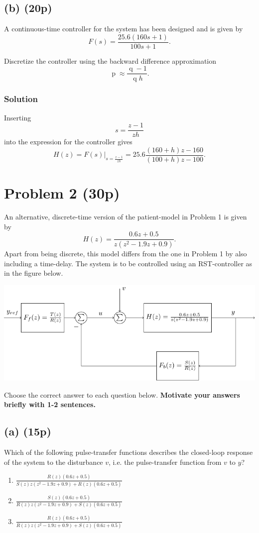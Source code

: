 \documentclass{scrartcl}
\begin{document}
\subsection*{(b) (20p)}
\label{sec-1-2}
A continuous-time controller for the system has been designed and is given by 
\[ F(s) = \frac{25.6(160s+1)}{100s+1}. \]

Discretize the controller using the backward difference approximation
\[ \operatorname{p} \approx \frac{\operatorname{q}-1}{\operatorname{q}h}. \]

\subsubsection*{Solution}
\label{sec-1-2-1}
Inserting \[s = \frac{z-1}{zh}\] into the expression for the controller gives
\[ H(z) = F(s)|_{s=\frac{z-1}{zh}} = 25.6\frac{(160+h)z -160}{(100+h)z - 100}. \]

\section*{Problem 2 (30p)}
\label{sec-2}
An alternative, discrete-time version of the patient-model in Problem 1 is given by
\[ H(z) = \frac{0.6z + 0.5}{z(z^2 - 1.9z + 0.9)}. \]
Apart from being discrete, this model differs from the one in Problem 1 by also including a time-delay.  The system is to be controlled using an RST-controller as in the figure below.
\begin{center}
\includegraphics[width=\linewidth]{rst-block}
\end{center}

Choose the correct answer to each question below. \textbf{Motivate your answers briefly with 1-2 sentences.}


\subsection*{(a) (15p)}
\label{sec-2-1}
Which of the following pulse-transfer functions describes the closed-loop response of the system to the disturbance $v$, i.e. the pulse-transfer function from $v$ to $y$?  
\begin{enumerate}
\item \( \frac{R(z) \left(0.6 z + 0.5\right)}{S(z) z \left(z^{2} - 1.9 z + 0.9\right) + R(z) \left(0.6 z + 0.5\right)} \)
\item \(\frac{S(z) \left(0.6 z + 0.5\right)}{R(z) z \left(z^{2} - 1.9 z + 0.9\right) + S(z) \left(0.6 z + 0.5\right)}\)
\item \( \frac{R(z) \left(0.6 z + 0.5\right)}{R(z) z \left(z^{2} - 1.9 z + 0.9\right) + S(z) \left(0.6 z + 0.5\right)} \)
\end{enumerate}
\end{document}
